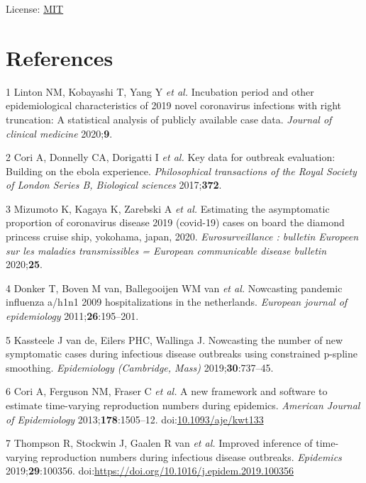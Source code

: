 \documentclass[]{article}
\begin{document}
License: \href{https://opensource.org/licenses/MIT}{MIT}

\hypertarget{references}{%
\section*{References}\label{references}}

\hypertarget{refs}{}
\leavevmode\hypertarget{ref-Linton:2020gg}{}%
1 Linton NM, Kobayashi T, Yang Y \emph{et al.} Incubation period and
other epidemiological characteristics of 2019 novel coronavirus
infections with right truncation: A statistical analysis of publicly
available case data. \emph{Journal of clinical medicine}
2020;\textbf{9}.

\leavevmode\hypertarget{ref-Cori:2017fg}{}%
2 Cori A, Donnelly CA, Dorigatti I \emph{et al.} Key data for outbreak
evaluation: Building on the ebola experience. \emph{Philosophical
transactions of the Royal Society of London Series B, Biological
sciences} 2017;\textbf{372}.

\leavevmode\hypertarget{ref-Mizumoto:2020ct}{}%
3 Mizumoto K, Kagaya K, Zarebski A \emph{et al.} Estimating the
asymptomatic proportion of coronavirus disease 2019 (covid-19) cases on
board the diamond princess cruise ship, yokohama, japan, 2020.
\emph{Eurosurveillance : bulletin Europeen sur les maladies
transmissibles = European communicable disease bulletin}
2020;\textbf{25}.

\leavevmode\hypertarget{ref-Donker:2011fk}{}%
4 Donker T, Boven M van, Ballegooijen WM van \emph{et al.} Nowcasting
pandemic influenza a/h1n1 2009 hospitalizations in the netherlands.
\emph{European journal of epidemiology} 2011;\textbf{26}:195--201.

\leavevmode\hypertarget{ref-vandeKassteele:2019cn}{}%
5 Kassteele J van de, Eilers PHC, Wallinga J. Nowcasting the number of
new symptomatic cases during infectious disease outbreaks using
constrained p-spline smoothing. \emph{Epidemiology (Cambridge, Mass)}
2019;\textbf{30}:737--45.

\leavevmode\hypertarget{ref-cori2013}{}%
6 Cori A, Ferguson NM, Fraser C \emph{et al.} A new framework and
software to estimate time-varying reproduction numbers during epidemics.
\emph{American Journal of Epidemiology} 2013;\textbf{178}:1505--12.
doi:\href{https://doi.org/10.1093/aje/kwt133}{10.1093/aje/kwt133}

\leavevmode\hypertarget{ref-THOMPSON2019100356}{}%
7 Thompson R, Stockwin J, Gaalen R van \emph{et al.} Improved inference
of time-varying reproduction numbers during infectious disease
outbreaks. \emph{Epidemics} 2019;\textbf{29}:100356.
doi:\href{https://doi.org/https://doi.org/10.1016/j.epidem.2019.100356}{https://doi.org/10.1016/j.epidem.2019.100356}
\end{document}
